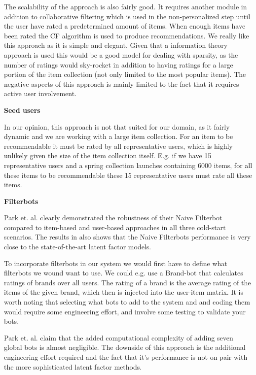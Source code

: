 The scalability of the approach is also fairly good. It requires another module in addition to collaborative filtering which is used in the non-personalized step until the user have rated a predetermined amount of items. When enough items have been rated the CF algorithm is used to produce recommendations. We really like this approach as it is simple and elegant. Given that a information theory approach is used this would be a good model for dealing with sparsity, as the number of ratings would sky-rocket in addition to having ratings for a large portion of the item collection (not only limited to the most popular items). The negative aspects of this approach is mainly limited to the fact that it requires active user involvement.\newline

\textbf{Seed users}

In our opinion, this approach is not that suited for our domain, as it fairly dynamic and we are working with a large item collection. For an item to be recommendable it must be rated by all representative users, which is highly unlikely given the size of the item collection itself. E.g. if we have 15 representative users and a spring collection launches containing 6000 items, for all these items to be recommendable these 15 representative users must rate all these items.\linebreak[4]

\textbf{Filterbots}

Park et. al. \cite{Park2006} clearly demonstrated the robustness of their Naive Filterbot compared to item-based and user-based approaches in all three cold-start scenarios. The results in \cite{Agarwal2009, Agarwal2010} also shows that the Naive Filterbots performance is very close to the state-of-the-art latent factor models.

To incorporate filterbots in our system we would first have to define what filterbots we wound want to use. We could e.g. use a Brand-bot that calculates ratings of brands over all users. The rating of a brand is the average rating of the items of the given brand, which then is injected into the user-item matrix. It is worth noting that selecting what bots to add to the system and and coding them would require some engineering effort, and involve some testing to validate your bots.

Park et. al. \cite{Park2006} claim that the added computational complexity of adding seven global bots is almost negligible. The downside of this approach is the additional engineering effort required and the fact that it's performance is not on pair with the more sophisticated latent factor methods.\newline

